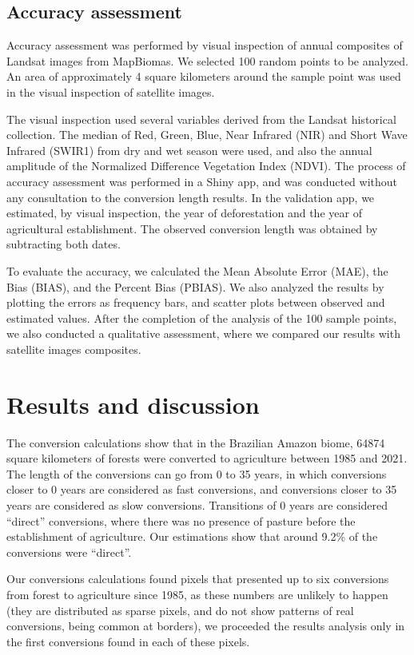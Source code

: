 \documentclass[essd, manuscript]{copernicus}
\begin{document}
\subsection{Accuracy assessment}

Accuracy assessment was performed by visual inspection of annual composites of Landsat images from MapBiomas.
We selected 100 random points to be analyzed.
An area of approximately 4 square kilometers around the sample point was used in the visual inspection of satellite images.

The visual inspection used several variables derived from the Landsat historical collection.
The median of Red, Green, Blue, Near Infrared (NIR) and Short Wave Infrared (SWIR1) from dry and wet season were used, and also the annual amplitude of the Normalized Difference Vegetation Index (NDVI).
The process of accuracy assessment was performed in a Shiny app, and was conducted without any consultation to the conversion length results.
In the validation app, we estimated, by visual inspection, the year of deforestation and the year of agricultural establishment.
The observed conversion length was obtained by subtracting both dates.

To evaluate the accuracy, we calculated the Mean Absolute Error (MAE), the Bias (BIAS), and the Percent Bias (PBIAS).
We also analyzed the results by plotting the errors as frequency bars, and scatter plots between observed and estimated values.
After the completion of the analysis of the 100 sample points, we also conducted a qualitative assessment, where we compared our results with satellite images composites.

\section{Results and discussion}

The conversion calculations show that in the Brazilian Amazon biome, 64874 square kilometers of forests were converted to agriculture between 1985 and 2021.
The length of the conversions can go from 0 to 35 years, in which conversions closer to 0 years are considered as fast conversions, and conversions closer to 35 years are considered as slow conversions.
Transitions of 0 years are considered ``direct'' conversions, where there was no presence of pasture before the establishment of agriculture.
Our estimations show that around 9.2\% of the conversions were ``direct''.

Our conversions calculations found pixels that presented up to six conversions from forest to agriculture since 1985, as these numbers are unlikely to happen (they are distributed as sparse pixels, and do not show patterns of real conversions, being common at borders), we proceeded the results analysis only in the first conversions found in each of these pixels.
\end{document}
